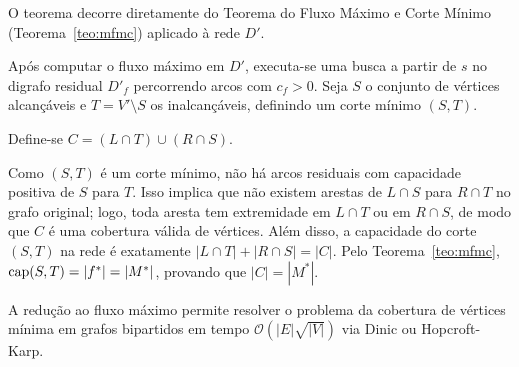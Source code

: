 \begin{demonstracao}
O teorema decorre diretamente do Teorema do Fluxo Máximo e Corte Mínimo (Teorema~\ref{teo:mfmc}) aplicado à rede $D'$.

Após computar o fluxo máximo em $D'$, executa-se uma busca a partir de $s$ no digrafo residual $D'_f$ percorrendo arcos com $c_f > 0$. Seja $S$ o conjunto de vértices alcançáveis e $T = V' \setminus S$ os inalcançáveis, definindo um corte mínimo $(S, T)$.

Define-se $C = (L \cap T) \cup (R \cap S)$.

Como $(S, T)$ é um corte mínimo, não há arcos residuais com capacidade positiva de $S$ para $T$. Isso implica que não existem arestas de $L \cap S$ para $R \cap T$ no grafo original; logo, toda aresta tem extremidade em $L \cap T$ ou em $R \cap S$, de modo que $C$ é uma cobertura válida de vértices. Além disso, a capacidade do corte $(S, T)$ na rede é exatamente $|L \cap T| + |R \cap S| = |C|$. Pelo Teorema~\ref{teo:mfmc}, $\operatorname{cap}(S, T) = |f^*| = |M^*|$, provando que $|C| = |M^*|$.
\end{demonstracao}

 A redução ao fluxo máximo permite resolver o problema da cobertura de vértices mínima em grafos bipartidos em tempo $\mathcal{O}(|E|\sqrt{|V|})$ via Dinic ou Hopcroft-Karp.


